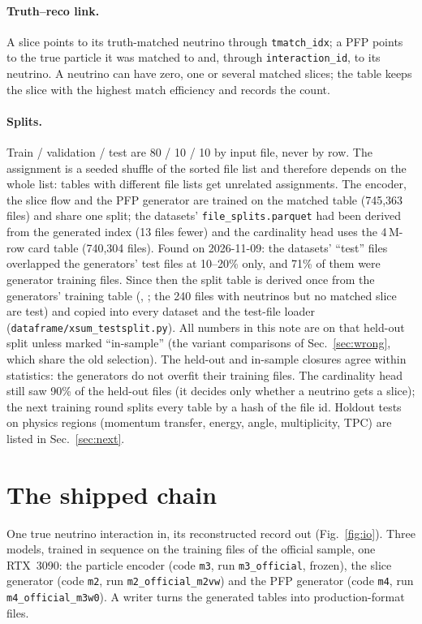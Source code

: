 \documentclass[11pt]{article}
\begin{document}
\paragraph{Truth--reco link.} A slice points to its truth-matched neutrino through \texttt{tmatch\_idx}; a PFP
points to the true particle it was matched to and, through \texttt{interaction\_id}, to its neutrino. A
neutrino can have zero, one or several matched slices; the table keeps the slice with the highest match
efficiency and records the count.

\paragraph{Splits.} Train / validation / test are 80 / 10 / 10 by input file, never by row. The assignment is a
seeded shuffle of the sorted file list and therefore depends on the whole list: tables with different file lists
get unrelated assignments. The encoder, the slice flow and the PFP generator are trained on the matched table
(745,363 files) and share one split; the datasets' \texttt{file\_splits.parquet} had been derived from the
generated index (13 files fewer) and the cardinality head uses the 4\,M-row card table (740,304 files). Found on
2026-11-09: the datasets' ``test'' files overlapped the generators' test files at 10--20\% only, and 71\% of them
were generator training files. Since then the split table is derived once from the generators' training table
(, ; the 240 files with
neutrinos but no matched slice are test) and copied into every dataset and the test-file loader
(\texttt{dataframe/xsum\_testsplit.py}). All numbers in this note are on that held-out split unless marked
``in-sample'' (the variant comparisons of Sec.~\ref{sec:wrong}, which share the old selection). The held-out
and in-sample closures agree within statistics: the generators do not overfit their training files. The
cardinality head still saw 90\% of the held-out files (it decides only whether a neutrino gets a slice); the next
training round splits every table by a hash of the file id. Holdout tests on physics regions (momentum
transfer, energy, angle, multiplicity, TPC) are listed in Sec.~\ref{sec:next}.

\section{The shipped chain}
\label{sec:chain}

One true neutrino interaction in, its reconstructed record out (Fig.~\ref{fig:io}). Three models, trained in
sequence on the training files of the official sample, one RTX~3090: the particle encoder (code \texttt{m3}, run
\texttt{m3\_official}, frozen), the slice generator (code \texttt{m2}, run \texttt{m2\_official\_m2vw}) and the
PFP generator (code \texttt{m4}, run \texttt{m4\_official\_m3w0}). A writer turns the generated tables into
production-format files.
\end{document}
